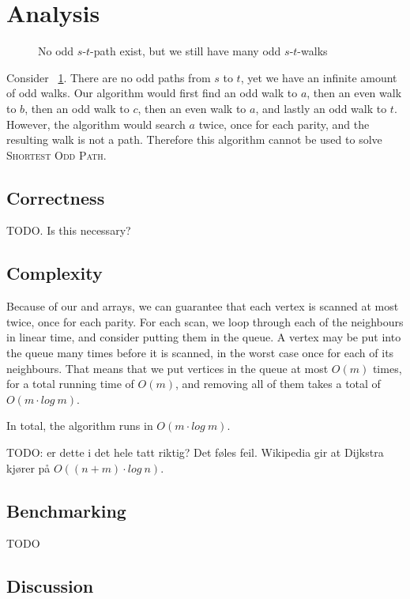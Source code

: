 \section{Analysis}

\begin{figure}
    \centering
    
    \caption{No odd $s$-$t$-path exist, but we still have many odd $s$-$t$-walks}
    \label{small2}
\end{figure}

Consider ~\ref{small2}. There are no odd paths from $s$ to $t$, yet we have an infinite amount of odd walks. Our algorithm would first find an odd walk to $a$, then an even walk to $b$, then an odd walk to $c$, then an even walk to $a$, and lastly an odd walk to $t$. However, the algorithm would search $a$ twice, once for each parity, and the resulting walk is not a path. Therefore this algorithm cannot be used to solve \textsc{Shortest Odd Path}.

\subsection{Correctness}
TODO.
Is this necessary?

\subsection{Complexity}
Because of our  and  arrays, we can guarantee that each vertex is scanned at most twice, once for each parity. 
For each scan, we loop through each of the neighbours in linear time, and consider putting them in the queue. A vertex may be put into the queue many times before it is scanned, in the worst case once for each of its neighbours. That means that we put vertices in the queue at most $O(m)$ times, for a total running time of $O(m)$, and removing all of them takes a total of $O(m \cdot log ~ m)$. 

In total, the algorithm runs in $O(m \cdot log ~ m)$.

TODO: er dette i det hele tatt riktig? Det føles feil. Wikipedia gir at Dijkstra kjører på $O((n+m) \cdot log ~ n)$.

\subsection{Benchmarking}
TODO

\subsection{Discussion}
